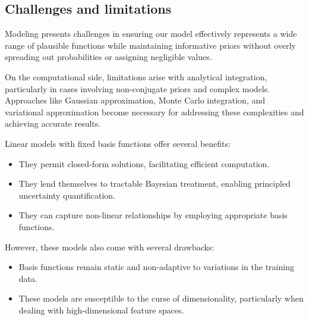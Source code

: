 \subsection{Challenges and limitations}
Modeling presents challenges in ensuring our model effectively represents a wide range of plausible functions while maintaining informative priors without overly spreading out probabilities or assigning negligible values.

On the computational side, limitations arise with analytical integration, particularly in cases involving non-conjugate priors and complex models. 
Approaches like Gaussian approximation, Monte Carlo integration, and variational approximation become necessary for addressing these complexities and achieving accurate results.

Linear models with fixed basis functions offer several benefits:
\begin{itemize}
    \item They permit closed-form solutions, facilitating efficient computation.
    \item They lend themselves to tractable Bayesian treatment, enabling principled uncertainty quantification.
    \item They can capture non-linear relationships by employing appropriate basis functions.
\end{itemize}
However, these models also come with several drawbacks:
\begin{itemize}
    \item Basis functions remain static and non-adaptive to variations in the training data.
    \item These models are susceptible to the curse of dimensionality, particularly when dealing with high-dimensional feature spaces.
\end{itemize}